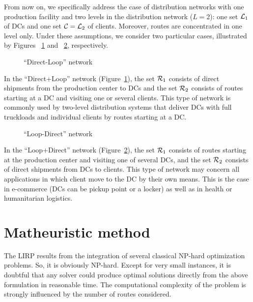 \documentclass[a4paper,10pt]{article}
\begin{document}
\begin{linenumbers}
From now on, we specifically address the case of distribution networks with one production facility and two levels
in the distribution network ($L=2$): one set $\mathcal{L}_1$ of DCs and one set $\mathcal{C}=\mathcal{L}_2$ of clients. 
Moreover, routes are concentrated in one level only. 
Under these assumptions, we consider two particular cases, illustrated by Figures ~\ref{fig:dl} and ~\ref{fig:ld}, respectively. 

\begin{figure}[htbp]
	\centering
	\caption{ ``Direct-Loop'' network}
	\label{fig:dl}
	
\end{figure}

In the ``Direct+Loop'' network (Figure~\ref{fig:dl}), the set $\mathcal{R}_1$ consists of direct shipments from the production center to DCs  and the set $\mathcal{R}_2$ consists of routes starting at a DC and visiting one or several clients.  This type of network is commonly used by two-level distribution systems that deliver DCs with full truckloads and individual clients by routes starting at a DC.

\begin{figure}[htbp]
	\centering
	\caption{``Loop-Direct'' network}
	\label{fig:ld}
\end{figure}
 
 
In the ``Loop+Direct'' network (Figure~\ref{fig:ld}), the set $\mathcal{R}_1$  consists of routes starting at the production center and visiting one of several DCs, and the set $\mathcal{R}_2$ consists of direct shipments from DCs to clients. This type of network may concern all applications in which client move to the DC by their own means. This is the case in e-commerce (DCs can be pickup point or a locker) as well as in health or humanitarian logistics. 




\section{Matheuristic method} 
\label{sec:algo}

The LIRP  results from the integration of several classical NP-hard optimization problems. So, it is obviously NP-hard.
Except for very small instances, it is doubtful that any solver could produce optimal solutions directly from the above formulation in reasonable time. The computational complexity of the problem is strongly influenced by the number of routes considered.


\end{linenumbers}
\end{document}
